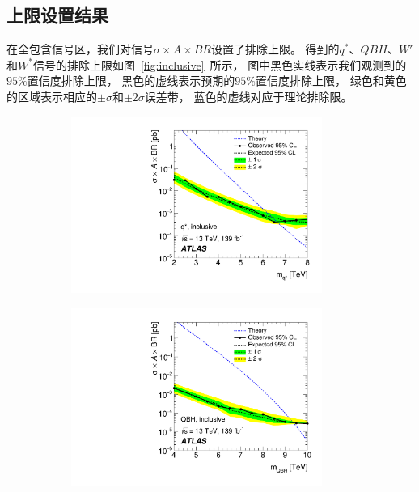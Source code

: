 \subsection{上限设置结果} 
\label{sec:DijetSig2}
在全包含信号区，我们对信号$\sigma\times A \times BR$设置了排除上限。
得到的$q^*$、$QBH$、$W'$和$W^*$信号的排除上限如图~\ref{fig:inclusive}~所示，
图中黑色实线表示我们观测到的$95\%$置信度排除上限，
黑色的虚线表示预期的$95\%$置信度排除上限，
绿色和黄色的区域表示相应的$\pm \sigma$和$\pm 2\sigma$误差带，
蓝色的虚线对应于理论排除限。

\begin{figure}[!thbp]
  \begin{subfigure}{.5\textwidth}
  \centering
  \includegraphics[width=0.9\textwidth]{figs/fig_04a.pdf}
  \caption{}
  \end{subfigure}
  \begin{subfigure}{.5\textwidth}
  \centering
  \includegraphics[width=0.9\textwidth]{figs/fig_04b.pdf}

\end{subfigure}
\end{figure}
